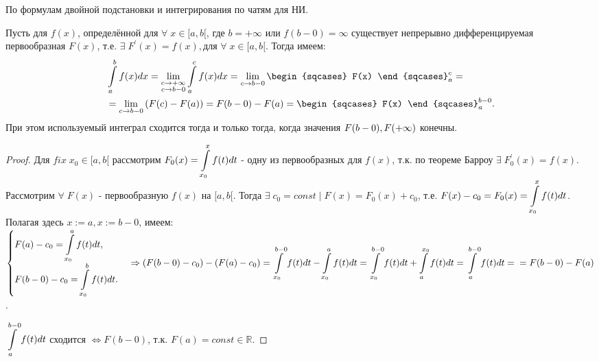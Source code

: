 \begin{plan}
\item По формулам двойной подстановки и интегрирования по чатям для НИ.
\end{plan}
\begin{theorem}
Пусть для $f(x)$, определённой для $\forall \; x \in [a, b[$, где $b = + \infty$ или $f(b - 0) = \infty$ существует непрерывно дифференцируемая первообразная $F(x)$, т.е. $\exists \; F^{'}(x) = f(x), \text{для }\forall \; x \in [a, b[$. Тогда имеем:
\begin{equation*}
\begin{split}
&\dint\limits_{a}^{b} f(x)dx = \lim\limitslimits{c \to + \infty}{c \to b-0} \dint\limits_{a}^{c} f(x)dx = \lim\limits_{c\to b-0} \begin{sqcases} F(x) \end{sqcases}^{c}_{a} = \\
& =\lim\limits_{c\to b-0} \left(F(c) - F(a)\right) = F(b-0) - F(a) = \begin{sqcases} F(x) \end{sqcases}^{b-0}_{a}.
\end{split}
\end{equation*}
При этом используемый интеграл сходится тогда и только тогда, когда значения $\linebreak F(b-0), F(+\infty)$ конечны.
\end{theorem}
\begin{proof}
	Для $fix \; x_0 \in [a,b[$ рассмотрим $F_0(x) = \displaystyle\int\limits_{x_0}^	{x}f(t)dt$ - одну из первообразных для $f(x)$, т.к. по теореме Барроу $\exists \; F_0^{'}(x) = f(x)$. Рассмотрим $\forall \; F(x)$ - первообразную $f(x)$ на $[a,b[$. Тогда $\exists \; c_0 = const \; | \; F(x) = F_0(x) + c_0$, т.е. $F(x) - c_0 = F_0(x) = \displaystyle\int\limits_{x_0}^{x}f(t)dt$. Полагая здесь $x := a, x := b-0$, имеем: \newline $\begin{cases}F(a) - c_0 = \dintl_{x_0}^{a} f(t)dt, \\ F(b-0) - c_0 = \dintl_{x_0}^{b} f(t)dt. \end{cases} \Rightarrow \left(F(b-0) - c_0\right) - \left(F(a) - c_0\right) = \dintl_{x_0}^{b-0} f(t)dt - \dintl_{x_0}^{a} f(t)dt = \dintl_{x_0}^{b-0} f(t)dt + \dintl_{a}^{x_0} f(t)dt = \dintl_{a}^{b-0} f(t)dt = \newline = F(b-0) - F(a)$.

	$\displaystyle\int\limits_{a}^{b-0} f(t)dt$ сходится $\Leftrightarrow F(b-0)$, т.к. $F(a) = const \in \mathbb{R}$.
\end{proof}
